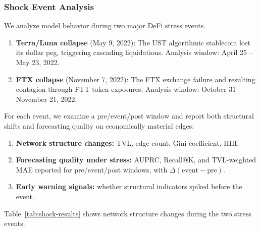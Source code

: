 \documentclass[preprint,12pt]{elsarticle}
\renewcommand{\paragraph}[1]{}
\begin{document}
\subsubsection{Shock Event Analysis}
\label{subsubsec:shock-events}

We analyze model behavior during two major DeFi stress events.

\paragraph{Events analyzed.}
\begin{enumerate}
  \item \textbf{Terra/Luna collapse} (May 9, 2022): The UST algorithmic stablecoin lost its dollar peg, triggering cascading liquidations. Analysis window: April 25 -- May 23, 2022.
  \item \textbf{FTX collapse} (November 7, 2022): The FTX exchange failure and resulting contagion through FTT token exposures. Analysis window: October 31 -- November 21, 2022.
\end{enumerate}

\paragraph{Analysis framework.}
For each event, we examine a pre/event/post window and report both structural shifts and forecasting quality on economically material edges:
\begin{enumerate}
  \item \textbf{Network structure changes:} TVL, edge count, Gini coefficient, HHI.
  \item \textbf{Forecasting quality under stress:} AUPRC, Recall@K, and TVL-weighted MAE reported for pre/event/post windows, with $\Delta(\text{event} - \text{pre})$.
  \item \textbf{Early warning signals:} whether structural indicators spiked before the event.
\end{enumerate}

\paragraph{Results.}
Table~\ref{tab:shock-results} shows network structure changes during the two stress events.
\end{document}
